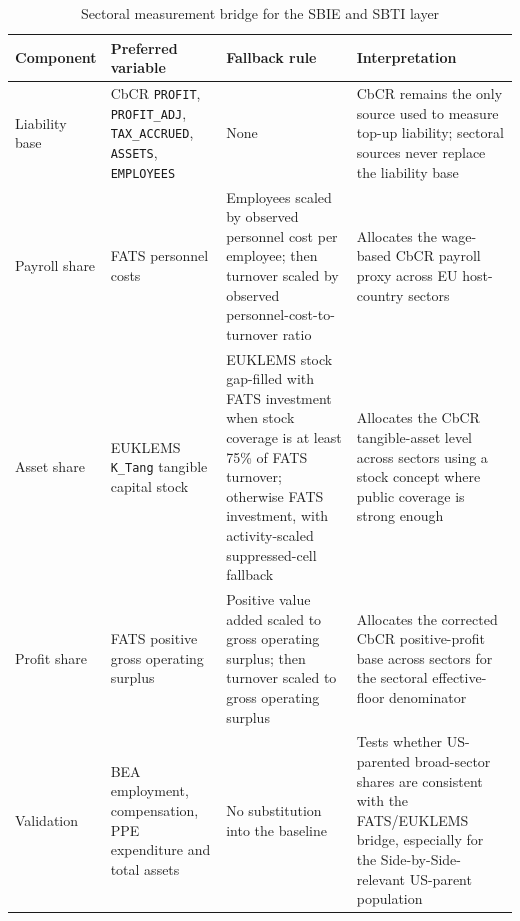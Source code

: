 \documentclass[11pt,a4paper]{article}
\newcommand{\code}[1]{\texttt{#1}}
\begin{document}
\begin{table}[H]
\centering
\caption{Sectoral measurement bridge for the SBIE and SBTI layer}
\label{tab:sectoral_bridge_hierarchy}
\footnotesize
\begin{tabularx}{\textwidth}{@{}L{2.5cm}L{3.2cm}L{3.2cm}X@{}}
\toprule
Component & Preferred variable & Fallback rule & Interpretation \\
\midrule
Liability base & CbCR \code{PROFIT}, \code{PROFIT\_ADJ}, \code{TAX\_ACCRUED}, \code{ASSETS}, \code{EMPLOYEES} & None & CbCR remains the only source used to measure top-up liability; sectoral sources never replace the liability base \\
Payroll share & FATS personnel costs & Employees scaled by observed personnel cost per employee; then turnover scaled by observed personnel-cost-to-turnover ratio & Allocates the wage-based CbCR payroll proxy across EU host-country sectors \\
Asset share & EUKLEMS \code{K\_Tang} tangible capital stock & EUKLEMS stock gap-filled with FATS investment when stock coverage is at least 75\% of FATS turnover; otherwise FATS investment, with activity-scaled suppressed-cell fallback & Allocates the CbCR tangible-asset level across sectors using a stock concept where public coverage is strong enough \\
Profit share & FATS positive gross operating surplus & Positive value added scaled to gross operating surplus; then turnover scaled to gross operating surplus & Allocates the corrected CbCR positive-profit base across sectors for the sectoral effective-floor denominator \\
Validation & BEA employment, compensation, PPE expenditure and total assets & No substitution into the baseline & Tests whether US-parented broad-sector shares are consistent with the FATS/EUKLEMS bridge, especially for the Side-by-Side-relevant US-parent population \\
\bottomrule
\end{tabularx}
\end{table}
\end{document}
